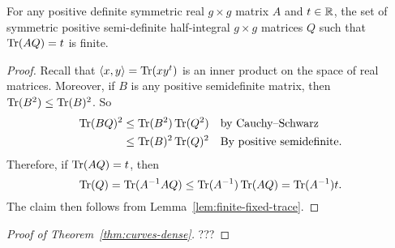 \documentclass{amsart}
\begin{document}
\begin{lemma}
  For any positive definite symmetric real $g \times g$ matrix $A$ and $t \in \mathbb{R}$, the set of symmetric positive semi-definite half-integral $g \times g$ matrices $Q$ such that $\operatorname{Tr}(AQ) = t$ is finite.
\end{lemma}
\begin{proof}
  Recall that $\langle x,y \rangle = \operatorname{Tr}(xy^t)$ is an inner product on the space of real matrices. Moreover, if $B$ is any positive semidefinite matrix, then $\operatorname{Tr}(B^2) \leq \operatorname{Tr}(B)^2$. So
  \begin{align*}
    \operatorname{Tr}(BQ)^2 &\leq \operatorname{Tr}(B^2)\operatorname{Tr}(Q^2)
    &&\text{by Cauchy–Schwarz}
    \\
    &\leq \operatorname{Tr}(B)^2\operatorname{Tr}(Q)^2
    &&\text{By positive semidefinite.}
  \end{align*}
  Therefore, if $\operatorname{Tr}(AQ) = t$, then
  \[
    \operatorname{Tr}(Q) = \operatorname{Tr}(A^{-1}AQ) \leq \operatorname{Tr}(A^{-1})\operatorname{Tr}(AQ) = \operatorname{Tr}(A^{-1})t.
  \]
  The claim then follows from Lemma~\ref{lem:finite-fixed-trace}.
\end{proof}




\begin{proof}[Proof of Theorem~\ref{thm:curves-dense}]
  ???
\end{proof}
\end{document}
